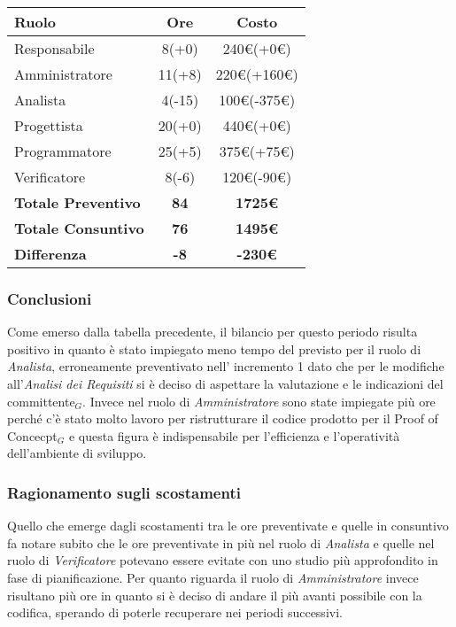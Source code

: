 {{{{{{{\quad
\def\tabularxcolumn#1{m{#1}}
{
	\begin{center}
		\renewcommand{\arraystretch}{1.4}
		\begin{tabularx}{10cm}{|X|c|c|}
			\hline
			\rowcolor{airforceblue}
			\textbf{Ruolo} & \textbf{Ore} & \textbf{Costo}\\
			\hline
			Responsabile & 8(+0) & 240\euro(+0\euro)\\
			\hline
			Amministratore & 11(+8) & 220\euro(+160\euro)\\
			\hline
			Analista & 4(-15) & 100\euro(-375\euro)\\
			\hline
			Progettista & 20(+0) & 440\euro(+0\euro)\\
			\hline
			Programmatore & 25(+5) & 375\euro(+75\euro)\\
			\hline
			Verificatore & 8(-6) & 120\euro(-90\euro)\\
			\hline
			\textbf{Totale Preventivo} & \textbf{84} & \textbf{1725\euro}\\
			\hline
			\textbf{Totale Consuntivo} & \textbf{76} & \textbf{1495\euro}\\
			\hline
			\textbf{Differenza} & \textbf{-8} & \textbf{-230\euro}
		\end{tabularx}
	\end{center}
	
\subsubsection{Conclusioni}\label{ConsuntivoPrimoPeriodoDiProgettazioneDiDettaglioCodificaConclusioni}
	Come emerso dalla tabella precedente, il bilancio per questo periodo risulta positivo in quanto è stato impiegato meno tempo del previsto per il ruolo di \textit{Analista}, erroneamente preventivato nell' incremento 1 dato che per le modifiche all'\textit{Analisi dei Requisiti} si è deciso di aspettare la valutazione e le indicazioni del committente$_G$.
	Invece nel ruolo di \textit{Amministratore} sono state impiegate più ore perché c'è stato molto lavoro per ristrutturare il codice prodotto per il Proof of Concecpt$_G$ e questa figura è indispensabile per l'efficienza e l'operatività dell'ambiente di sviluppo.
	
\subsubsection{Ragionamento sugli scostamenti}\label{ConsuntivoPrimoPeriodoDiProgettazioneDiDettaglioCodificaRagionamentoScostamenti}
	Quello che emerge dagli scostamenti tra le ore preventivate e quelle in consuntivo fa notare subito che le ore preventivate in più nel ruolo di \textit{Analista} e quelle nel ruolo di \textit{Verificatore} potevano essere evitate con uno studio più approfondito in fase di pianificazione.
	Per quanto riguarda il ruolo di \textit{Amministratore} invece risultano più ore in quanto si è deciso di andare il più avanti possibile con la codifica, sperando di poterle recuperare nei periodi successivi.

}}}}}}}}
